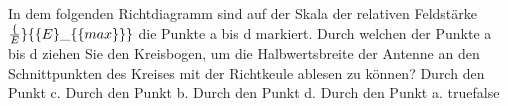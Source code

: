     {In dem folgenden Richtdiagramm sind auf der Skala der relativen Feldstärke $\frac\{E\}\{\{E\}\_\{\textrm\{max\}\}\}$ die Punkte a bis d markiert. Durch welchen der Punkte a bis d ziehen Sie den Kreisbogen, um die Halbwertsbreite der Antenne an den Schnittpunkten des Kreises mit der Richtkeule ablesen zu können?}
    {Durch den Punkt c.}
    {Durch den Punkt b.}
    {Durch den Punkt d.}
    {Durch den Punkt a.}
    {true}{false}